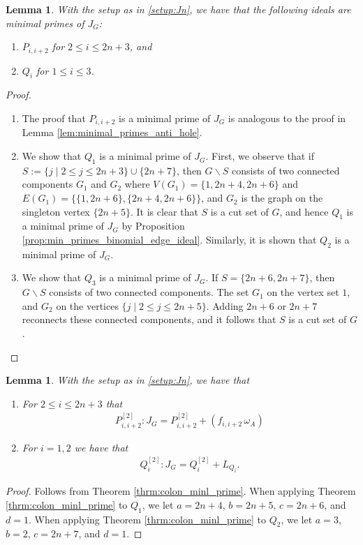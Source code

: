 \documentclass[12pt,a4paper]{amsart}
\theoremstyle{plain}
\newtheorem{lem}[thrm]{Lemma}
\def\blem{\begin{lem}}
\def\elem{\end{lem}}
\theoremstyle{definition}
\def\bproof{\begin{proof}}
\def\eproof{\end{proof}}
\theoremstyle{remark}
\let\setminus=\smallsetminus
\begin{document}
\blem
\label{lem:Jn_min_primes}
With the setup as in \ref{setup:Jn}, we have that the following ideals are minimal primes of $J_{G}$:
\begin{enumerate}
\item $P_{i,i+2}$ for $2 \leq i \leq 2n+3$, and
\item $Q_{i}$ for $1 \leq i \leq 3$.
\end{enumerate}
\elem

\bproof
\begin{enumerate}
    \item The proof that $P_{i,i+2}$ is a minimal prime of $J_{G}$ is analogous to the proof in Lemma \ref{lem:minimal_primes_anti_hole}.
    \item We show that $Q_{1}$ is a minimal prime of $J_{G}$. First, we observe that if $S := \{j \mid 2 \leq j \leq 2n+3\} \cup \{2n+7\}$, then $G \setminus S$ consists of two connected components $G_{1}$ and $G_{2}$ where $V(G_{1}) = \{1,2n+4,2n+6\}$ and $E(G_{1}) = \{ \{1,2n+6\}, \{2n+4,2n+6\} \}$, and $G_{2}$ is the graph on the singleton vertex $\{2n+5\}$. It is clear that $S$ is a cut set of $G$, and hence $Q_{1}$ is a minimal prime of $J_{G}$ by Proposition \ref{prop:min_primes_binomial_edge_ideal}. Similarly, it is shown that $Q_{2}$ is a minimal prime of $J_{G}$. 
    \item We show that $Q_{3}$ is a minimal prime of $J_{G}$. If $S = \{2n+6,2n+7\}$, then $G \setminus S$ consists of two connected components. The set $G_{1}$ on the vertex set $1$, and $G_{2}$ on the vertices $\{j \mid 2 \leq j \leq 2n+5\}$. Adding $2n+6$ or $2n+7$ reconnects these connected components, and it follows that $S$ is a cut set of $G$.
\end{enumerate}
\eproof

\blem
\label{lem:colon_minimal_primes_Jn}
With the setup as in \ref{setup:Jn}, we have that
\begin{enumerate}
\item For $2 \leq i \leq 2n+3$ that 
\begin{align*}
    P_{i,i+2}^{[2]} : J_{G} = P_{i,i+2}^{[2]} + (f_{i,i+2} \, \omega_{A})
\end{align*}
\item For $i = 1,2$ we have that 
\begin{align*}
    Q_{i}^{[2]}:J_{G} = Q_{i}^{[2]} + L_{Q_{i}}.
\end{align*}
\end{enumerate}
\elem

\bproof
Follows from Theorem \ref{thrm:colon_minl_prime}. When applying Theorem \ref{thrm:colon_minl_prime} to $Q_{1}$, we let $a = 2n+4$, $b = 2n+5$, $c = 2n+6$, and $d = 1$. When applying Theorem \ref{thrm:colon_minl_prime} to $Q_{2}$, we let $a = 3$, $b = 2$, $c = 2n+7$, and $d = 1$.
\eproof
\end{document}
